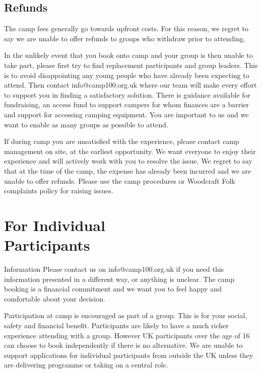\documentclass[a4paper, 11pt]{report}
\begin{document}
\section{Refunds}
The camp fees generally go towards upfront costs.  For this reason, we regret to say we are unable to offer refunds to groups who withdraw prior to attending. 

In the unlikely event that you book onto camp and your group is then unable to take part, please first try to find replacement participants and group leaders. This is to avoid disappointing any young people who have already been expecting to attend. Then contact info@camp100.org.uk where our team will make every effort to support you in finding a satisfactory solution. There is guidance available for fundraising, an access fund to support campers for whom finances are a barrier and support for accessing camping equipment. You are important to us and we want to enable as many groups as possible to attend.
 
If during camp you are unsatisfied with the experience, please contact camp management on site, at the earliest opportunity. We want everyone to enjoy their experience and will actively work with you to resolve the issue. We regret to say that at the time of the camp, the expense has already been incurred and we are unable to offer refunds. Please use the camp procedures or Woodcraft Folk complaints policy for raising issues.


\chapter[For Individual Participants]{For Individual\\Participants}
\begin{callout-green}{Information}
Please contact us on info@camp100.org.uk if you need this information presented in a different way, or anything is unclear. The camp booking is a financial commitment and we want you to feel happy and comfortable about your decision. 
\end{callout-green}

Participation at camp is encouraged as part of a group. This is for your social, safety and financial benefit. Participants are likely to have a much richer experience attending with a group. However UK participants over the age of 16 can choose to book independently if there is no alternative. We are unable to support applications for individual participants from outside the UK unless they are delivering programme or taking on a central role.
\end{document}
